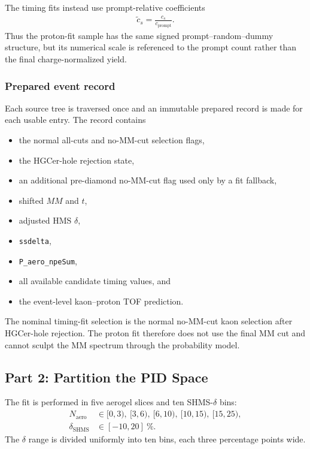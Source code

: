 \documentclass[11pt]{article}
\begin{document}
The timing fits instead use prompt-relative coefficients
\begin{align}
  \widetilde c_s
  =\frac{c_s}{c_{\mathrm{prompt}}}.
\end{align}
Thus the proton-fit sample has the same signed prompt--random--dummy structure,
but its numerical scale is referenced to the prompt count rather than the final
charge-normalized yield.

\subsubsection*{Prepared event record}

Each source tree is traversed once and an immutable prepared record is made for
each usable entry.  The record contains
\begin{itemize}[leftmargin=2em]
  \item the normal all-cuts and no-MM-cut selection flags,
  \item the HGCer-hole rejection state,
  \item an additional pre-diamond no-MM-cut flag used only by a fit fallback,
  \item shifted $MM$ and $t$,
  \item adjusted HMS $\delta$,
  \item \texttt{ssdelta},
  \item \texttt{P\_aero\_npeSum},
  \item all available candidate timing values, and
  \item the event-level kaon--proton TOF prediction.
\end{itemize}

The nominal timing-fit selection is the normal no-MM-cut kaon selection after
HGCer-hole rejection.  The proton fit therefore does not use the final MM cut
and cannot sculpt the MM spectrum through the probability model.

\subsection{Part 2: Partition the PID Space}

The fit is performed in five aerogel slices and ten SHMS-$\delta$ bins:
\begin{align}
  N_{\mathrm{aero}}
  &\in [0,3),\ [3,6),\ [6,10),\ [10,15),\ [15,25),\\
  \delta_{\mathrm{SHMS}}
  &\in [-10,20]\ \%.
\end{align}
The $\delta$ range is divided uniformly into ten bins, each three percentage
points wide.
\end{document}
